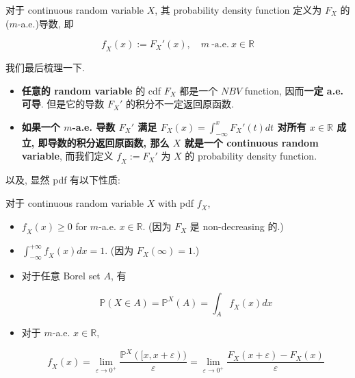 \begin{definition}{}

对于 continuous random variable \(\mathit{X}\), 其 probability density function 定义为 \(\mathit{F}_{\mathit{X}}\) 的 (\(\mathit{m}\)-a.e.)导数, 即

\[\mathit{f}_{\mathit{X}}(\mathit{x}) := \mathit{F}_{\mathit{X}}'(\mathit{x}),\quad\mathit{m}\ \text{-a.e.}\ \mathit{x} \in \mathbb{R}\]

\end{definition}

我们最后梳理一下.

\begin{itemize}
\item
  \textbf{任意的 random variable} 的 cdf \(\mathit{F}_{\mathit{X}}\) 都是一个 \(\mathit{N}\mathit{B}\mathit{V}\) function, 因而\textbf{一定 a.e. 可导}. 但是它的导数 \(\mathit{F}_{\mathit{X}}'\) 的积分不一定返回原函数.
\item
  \textbf{如果一个 \(\mathit{m}\)-a.e. 导数 \(\mathit{F}_{\mathit{X}}'\) 满足 \(\mathit{F}_{\mathit{X}}(\mathit{x}) = \int_{- \infty}^{\mathit{x}}\mathit{F}_{\mathit{X}}'(\mathit{t})\mathit{d}\mathit{t}\) 对所有 \(\mathit{x} \in \mathbb{R}\) 成立, 即导数的积分返回原函数, 那么 \(\mathit{X}\) 就是一个 continuous random variable}, 而我们定义 \(\mathit{f}_{\mathit{X}} := \mathit{F}_{\mathit{X}}'\) 为 \(\mathit{X}\) 的 probability density function.
\end{itemize}

以及, 显然 pdf 有以下性质:

\begin{proposition}{}

对于 continuous random variable \(\mathit{X}\) with pdf \(\mathit{f}_{\mathit{X}}\),

\begin{itemize}
\item
  \(\mathit{f}_{\mathit{X}}(\mathit{x}) \geq 0\) for \(\mathit{m}\)-a.e. \(\mathit{x} \in \mathbb{R}\). (因为 \(\mathit{F}_{\mathit{X}}\) 是 non-decreasing 的.)
\item
  \(\int_{- \infty}^{+ \infty}\mathit{f}_{\mathit{X}}(\mathit{x})\mathit{d}\mathit{x} = 1\). (因为 \(\mathit{F}_{\mathit{X}}(\infty) = 1\).)
\item
  对于任意 Borel set \(\mathit{A}\), 有

  \[\mathbb{P}(\mathit{X} \in \mathit{A}) = \mathbb{P}^{\mathit{X}}(\mathit{A}) = \int_{\mathit{A}}\mathit{f}_{\mathit{X}}(\mathit{x})\mathit{d}\mathit{x}\]
\item
  对于 \(\mathit{m}\)-a.e. \(\mathit{x} \in \mathbb{R}\),

  \[\mathit{f}_{\mathit{X}}(\mathit{x}) = \lim\limits_{\mathit{\varepsilon}\rightarrow 0^{+}}\frac{\mathbb{P}^{\mathit{X}}(\lbrack\mathit{x},\mathit{x} + \mathit{\varepsilon}))}{\mathit{\varepsilon}} = \lim\limits_{\mathit{\varepsilon}\rightarrow 0^{+}}\frac{\mathit{F}_{\mathit{X}}(\mathit{x} + \mathit{\varepsilon}) - \mathit{F}_{\mathit{X}}(\mathit{x})}{\mathit{\varepsilon}}\]
\end{itemize}

\end{proposition}

